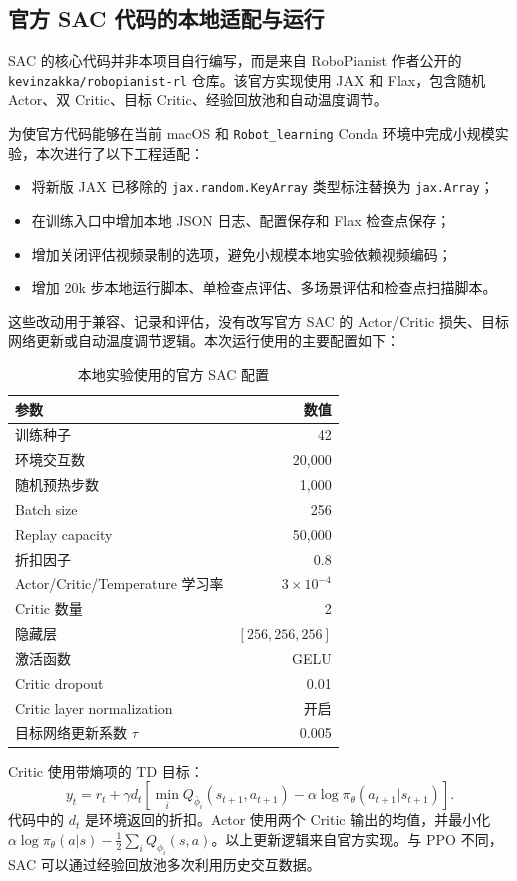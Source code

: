 \documentclass[UTF8,a4paper,11pt]{ctexart}
\begin{document}
\subsection{官方 SAC 代码的本地适配与运行}

SAC 的核心代码并非本项目自行编写，而是来自 RoboPianist 作者公开的 \texttt{kevinzakka/robopianist-rl} 仓库。该官方实现使用 JAX 和 Flax，包含随机 Actor、双 Critic、目标 Critic、经验回放池和自动温度调节。

为使官方代码能够在当前 macOS 和 \texttt{Robot\_learning} Conda 环境中完成小规模实验，本次进行了以下工程适配：
\begin{itemize}
  \item 将新版 JAX 已移除的 \texttt{jax.random.KeyArray} 类型标注替换为 \texttt{jax.Array}；
  \item 在训练入口中增加本地 JSON 日志、配置保存和 Flax 检查点保存；
  \item 增加关闭评估视频录制的选项，避免小规模本地实验依赖视频编码；
  \item 增加 20k 步本地运行脚本、单检查点评估、多场景评估和检查点扫描脚本。
\end{itemize}
这些改动用于兼容、记录和评估，没有改写官方 SAC 的 Actor/Critic 损失、目标网络更新或自动温度调节逻辑。本次运行使用的主要配置如下：
\begin{table}[H]
\centering
\caption{本地实验使用的官方 SAC 配置}
\begin{tabular}{lr}
\toprule
参数 & 数值 \\
\midrule
训练种子 & 42 \\
环境交互数 & 20,000 \\
随机预热步数 & 1,000 \\
Batch size & 256 \\
Replay capacity & 50,000 \\
折扣因子 & 0.8 \\
Actor/Critic/Temperature 学习率 & $3\times10^{-4}$ \\
Critic 数量 & 2 \\
隐藏层 & $[256,256,256]$ \\
激活函数 & GELU \\
Critic dropout & 0.01 \\
Critic layer normalization & 开启 \\
目标网络更新系数 $\tau$ & 0.005 \\
\bottomrule
\end{tabular}
\end{table}

Critic 使用带熵项的 TD 目标：
\begin{equation}
y_t=r_t+\gamma d_t
\left[
\min_i Q_{\bar\phi_i}(s_{t+1},a_{t+1})
-\alpha\log\pi_\theta(a_{t+1}|s_{t+1})
\right].
\end{equation}
代码中的 $d_t$ 是环境返回的折扣。Actor 使用两个 Critic 输出的均值，并最小化 $\alpha\log\pi_\theta(a|s)-\frac{1}{2}\sum_i Q_{\phi_i}(s,a)$。以上更新逻辑来自官方实现。与 PPO 不同，SAC 可以通过经验回放池多次利用历史交互数据。
\end{document}
